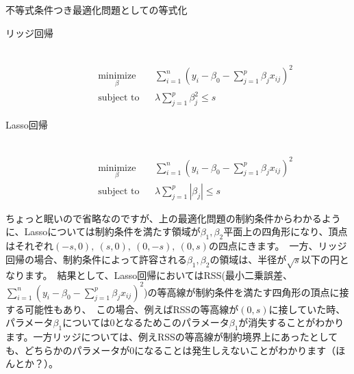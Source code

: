 \documentclass[uplatex]{jsarticle}
\begin{document}
\begin{itembox}[l]{不等式条件つき最適化問題としての等式化}
  \begin{description}
    \item[リッジ回帰]\mbox{}\\
    \begin{equation*}
      \begin{aligned}
      & \underset{\beta}{\text{minimize}}
      & &\displaystyle{\sum_{i=1}^n \left(y_i - \beta_0 - \sum_{j=1}^p \beta_jx_{ij}\right)^2 }  \\
      & \text{subject to}
      & & \lambda \sum_{j=1}^p \beta_j^2 \leq s
      \end{aligned}
    \end{equation*}
    \item[Lasso回帰]\mbox{}\\
      \begin{equation*}
        \begin{aligned}
        & \underset{\beta}{\text{minimize}}
        & &\displaystyle{\sum_{i=1}^n \left(y_i - \beta_0 - \sum_{j=1}^p \beta_jx_{ij}\right)^2 }  \\
        & \text{subject to}
        & & \lambda \sum_{j=1}^p |\beta_j| \leq s
        \end{aligned}
      \end{equation*}
  \end{description}
\end{itembox}
%
ちょっと眠いので省略なのですが、上の最適化問題の制約条件からわかるように、Lassoについては制約条件を満たす領域が$\beta_1, \beta_2$平面上の四角形になり、頂点はそれぞれ$(-s, 0),\ (s,0),\ (0, -s),\ (0, s)$の四点にきます。\
一方、リッジ回帰の場合、制約条件によって許容される$\beta_1, \beta_2$の領域は、半径が$\sqrt{s}$以下の円となります。\
結果として、Lasso回帰においてはRSS(最小二乗誤差、$\sum_{i=1}^n \left(y_i - \beta_0 - \sum_{j=1}^p \beta_jx_{ij}\right)^2 $)の等高線が制約条件を満たす四角形の頂点に接する可能性もあり、\
この場合、例えばRSSの等高線が$(0,s)$に接していた時、パラメータ$\beta_1$については0となるためこのパラメータ$\beta_1$が消失することがわかります。一方リッジについては、例えRSSの等高線が制約境界上にあったとしても、どちらかのパラメータが0になることは発生しえないことがわかります（ほんとか？）。\
\end{document}
